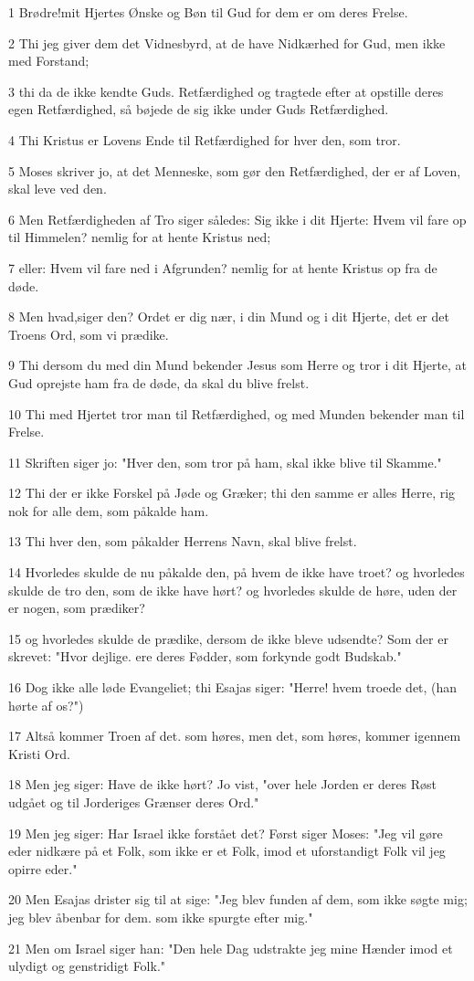 \par 1 Brødre!mit Hjertes Ønske og Bøn til Gud for dem er om deres Frelse.
\par 2 Thi jeg giver dem det Vidnesbyrd, at de have Nidkærhed for Gud, men ikke med Forstand;
\par 3 thi da de ikke kendte Guds. Retfærdighed og tragtede efter at opstille deres egen Retfærdighed, så bøjede de sig ikke under Guds Retfærdighed.
\par 4 Thi Kristus er Lovens Ende til Retfærdighed for hver den, som tror.
\par 5 Moses skriver jo, at det Menneske, som gør den Retfærdighed, der er af Loven, skal leve ved den.
\par 6 Men Retfærdigheden af Tro siger således: Sig ikke i dit Hjerte: Hvem vil fare op til Himmelen? nemlig for at hente Kristus ned;
\par 7 eller: Hvem vil fare ned i Afgrunden? nemlig for at hente Kristus op fra de døde.
\par 8 Men hvad,siger den? Ordet er dig nær, i din Mund og i dit Hjerte, det er det Troens Ord, som vi prædike.
\par 9 Thi dersom du med din Mund bekender Jesus som Herre og tror i dit Hjerte, at Gud oprejste ham fra de døde, da skal du blive frelst.
\par 10 Thi med Hjertet tror man til Retfærdighed, og med Munden bekender man til Frelse.
\par 11 Skriften siger jo: "Hver den, som tror på ham, skal ikke blive til Skamme."
\par 12 Thi der er ikke Forskel på Jøde og Græker; thi den samme er alles Herre, rig nok for alle dem, som påkalde ham.
\par 13 Thi hver den, som påkalder Herrens Navn, skal blive frelst.
\par 14 Hvorledes skulde de nu påkalde den, på hvem de ikke have troet? og hvorledes skulde de tro den, som de ikke have hørt? og hvorledes skulde de høre, uden der er nogen, som prædiker?
\par 15 og hvorledes skulde de prædike, dersom de ikke bleve udsendte? Som der er skrevet: "Hvor dejlige. ere deres Fødder, som forkynde godt Budskab."
\par 16 Dog ikke alle løde Evangeliet; thi Esajas siger: "Herre! hvem troede det, (han hørte af os?")
\par 17 Altså kommer Troen af det. som høres, men det, som høres, kommer igennem Kristi Ord.
\par 18 Men jeg siger: Have de ikke hørt? Jo vist, "over hele Jorden er deres Røst udgået og til Jorderiges Grænser deres Ord."
\par 19 Men jeg siger: Har Israel ikke forstået det? Først siger Moses: "Jeg vil gøre eder nidkære på et Folk, som ikke er et Folk, imod et uforstandigt Folk vil jeg opirre eder."
\par 20 Men Esajas drister sig til at sige: "Jeg blev funden af dem, som ikke søgte mig; jeg blev åbenbar for dem. som ikke spurgte efter mig."
\par 21 Men om Israel siger han: "Den hele Dag udstrakte jeg mine Hænder imod et ulydigt og genstridigt Folk."

